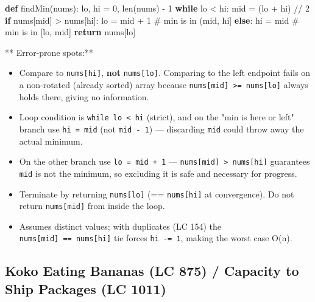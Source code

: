 \documentclass[11pt]{article}
\providecommand{\tightlist}{\setlength{\itemsep}{1pt}\setlength{\parskip}{0pt}}
\newenvironment{Shaded}{\begin{snugshade}}{\end{snugshade}}
\newcommand{\BuiltInTok}[1]{\textcolor[rgb]{0.50,0.55,0.55}{#1}}
\newcommand{\CommentTok}[1]{\textcolor[rgb]{0.48,0.49,0.49}{#1}}
\newcommand{\ControlFlowTok}[1]{\textcolor[rgb]{0.99,0.74,0.29}{\textbf{#1}}}
\newcommand{\DecValTok}[1]{\textcolor[rgb]{0.96,0.45,0.00}{#1}}
\newcommand{\KeywordTok}[1]{\textcolor[rgb]{0.81,0.81,0.76}{\textbf{#1}}}
\newcommand{\NormalTok}[1]{\textcolor[rgb]{0.81,0.81,0.76}{#1}}
\newcommand{\OperatorTok}[1]{\textcolor[rgb]{0.81,0.81,0.76}{#1}}
\begin{document}

\begin{Shaded}
\begin{Highlighting}[]
\KeywordTok{def}\NormalTok{ findMin(nums):}
\NormalTok{    lo, hi }\OperatorTok{=} \DecValTok{0}\NormalTok{, }\BuiltInTok{len}\NormalTok{(nums) }\OperatorTok{{-}} \DecValTok{1}
    \ControlFlowTok{while}\NormalTok{ lo }\OperatorTok{\textless{}}\NormalTok{ hi:}
\NormalTok{        mid }\OperatorTok{=}\NormalTok{ (lo }\OperatorTok{+}\NormalTok{ hi) }\OperatorTok{//} \DecValTok{2}
        \ControlFlowTok{if}\NormalTok{ nums[mid] }\OperatorTok{\textgreater{}}\NormalTok{ nums[hi]:}
\NormalTok{            lo }\OperatorTok{=}\NormalTok{ mid }\OperatorTok{+} \DecValTok{1}        \CommentTok{\# min is in (mid, hi]}
        \ControlFlowTok{else}\NormalTok{:}
\NormalTok{            hi }\OperatorTok{=}\NormalTok{ mid            }\CommentTok{\# min is in [lo, mid]}
    \ControlFlowTok{return}\NormalTok{ nums[lo]}
\end{Highlighting}
\end{Shaded}

** Error-prone spots:**

\begin{itemize}
\tightlist
\item
  Compare to \texttt{nums{[}hi{]}}, \textbf{not} \texttt{nums{[}lo{]}}. Comparing to the left endpoint fails on a non-rotated (already sorted) array because \texttt{nums{[}mid{]}\ \textgreater{}=\ nums{[}lo{]}} always holds there, giving no information.
\item
  Loop condition is \texttt{while\ lo\ \textless{}\ hi} (strict), and on the "min is here or left" branch use \texttt{hi\ =\ mid} (not \texttt{mid\ -\ 1}) --- discarding \texttt{mid} could throw away the actual minimum.
\item
  On the other branch use \texttt{lo\ =\ mid\ +\ 1} --- \texttt{nums{[}mid{]}\ \textgreater{}\ nums{[}hi{]}} guarantees \texttt{mid} is not the minimum, so excluding it is safe and necessary for progress.
\item
  Terminate by returning \texttt{nums{[}lo{]}} (== \texttt{nums{[}hi{]}} at convergence). Do not return \texttt{nums{[}mid{]}} from inside the loop.
\item
  Assumes distinct values; with duplicates (LC 154) the \texttt{nums{[}mid{]}\ ==\ nums{[}hi{]}} tie forces \texttt{hi\ -=\ 1}, making the worst case O(n).
\end{itemize}

\subsection{Koko Eating Bananas (LC 875) / Capacity to Ship Packages (LC 1011)}\label{koko-eating-bananas-lc-875--capacity-to-ship-packages-lc-1011}
\end{document}
